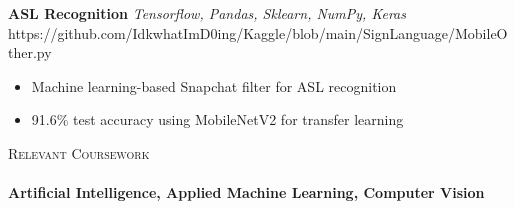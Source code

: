 \documentclass[a4paper]{article}
\newcommand{\lineunder} {
    \vspace*{-8pt} \\
    \hspace*{-18pt} \hrulefill \\
}
\newcommand{\header} [1] {
    {\hspace*{-18pt}\vspace*{6pt} \textsc{#1}}
    \vspace*{-6pt} \lineunder
}
\begin{document}
        \vspace*{2mm}
    {\textbf{ASL Recognition}} {\sl Tensorflow, Pandas, Sklearn, NumPy, Keras} \hfill https://github.com/IdkwhatImD0ing/Kaggle/blob/main/SignLanguage/MobileOther.py\\
        \vspace{-1mm}
\begin{itemize} \itemsep 1pt
  \item Machine learning-based Snapchat filter for ASL recognition
  \item 91.6\% test accuracy using MobileNetV2 for transfer learning
\end{itemize}
        \vspace*{2mm}

\header{Relevant Coursework}
      \textbf{Artificial Intelligence, Applied Machine Learning, Computer Vision}\\

\vspace*{2mm}

    \ 
    
\end{document}
